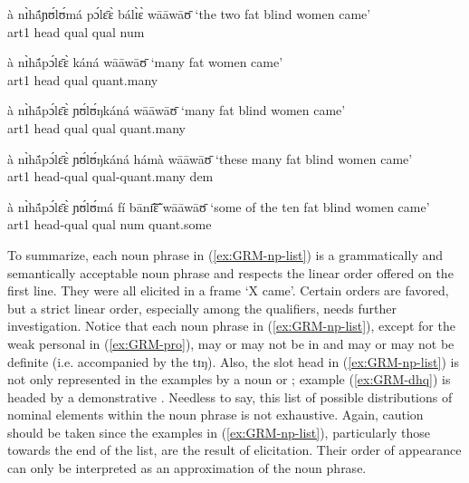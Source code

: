 \begin{exe}
\begin{exe}
\begin{exe}
\begin{exe}
\begin{exe}
\begin{exe}
\begin{exe}
\begin{exe}
\begin{exe}
\begin{exe}
\begin{exe}
  \ex\label{ex:GRM-ahqlqln}
à nɪ̀hã́ɲʊ́lʊ́má pɔ́lɛ̄ɛ̀ bálɪ̀ɛ̀ wāāwāʊ̄    {\rm  `the two fat blind women  came'} 
\\
  {\sc art1} {\sc head}  {\sc qual} {\sc qual}  {\sc num}  

\ex\label{ex:GRM-ahqlq} 
à nɪ̀hã́pɔ́lɛ̄ɛ̀    káná   wāāwāʊ̄  {\rm  `many fat women  came'}\\
{\sc art1} {\sc head} {\sc qual} {\sc quant}{\rm .many}

 \ex\label{ex:GRM-ahqlqlq} 
à nɪ̀hã́pɔ́lɛ̄ɛ̀    ɲʊ́lʊ́ŋkáná   wāāwāʊ̄    {\rm  `many fat blind women  came'}   
\\
{\sc art1} {\sc head} {\sc qual} {\sc qual} {\sc quant}{\rm .many}  

  \ex\label{ex:GRM-ahqlqlqd} 
à nɪ̀hã́pɔ́lɛ̄ɛ̀   ɲʊ́lʊ́ŋkáná  hámà    wāāwāʊ̄ {\rm  `these many fat 
blind 
women  came'}\\
{\sc art1} {\sc head}-{\sc qual} {\sc qual}-{\sc quant}{\rm .many}  {\sc dem}


\ex\label{ex:GRM-phqlnq} 
à nɪ̀hã́pɔ́lɛ̄ɛ̀  ɲʊ́lʊ́má  fí bānɪ̃̄ɛ̃̄ wāāwāʊ̄    {\rm  `some of the ten fat 
blind women  came'}\\
{\sc art1} {\sc head}-{\sc qual} {\sc qual} {\sc num}  {\sc quant}{\rm .some} 



 
\z 
 \z
 
 
 To summarize, each noun phrase in (\ref{ex:GRM-np-list}) is a grammatically and semantically acceptable noun phrase and  respects the linear order offered on the first line. They were all elicited in a frame `X came'.  Certain orders are favored, but a strict linear order, especially among the qualifiers, needs further investigation.   Notice that each noun phrase in (\ref{ex:GRM-np-list}), except for the weak personal  in (\ref{ex:GRM-pro}),  may or may not be in  and may or may not be definite (i.e. accompanied by the  {\sls tɪŋ}). Also,  the slot {\sc head}  in (\ref{ex:GRM-np-list}) is not only represented in the examples by a noun or ;  example (\ref{ex:GRM-dhq}) is headed by a demonstrative . Needless to say, this list of possible distributions of nominal elements within the noun phrase is not exhaustive. Again, caution should be taken since the examples in (\ref{ex:GRM-np-list}), particularly those towards the end of the list, are the result of elicitation. Their order of appearance can only be  interpreted  as  an approximation of the noun phrase. 



\end{exe}
\end{exe}
\end{exe}
\end{exe}
\end{exe}
\end{exe}
\end{exe}
\end{exe}
\end{exe}
\end{exe}
\end{exe}
